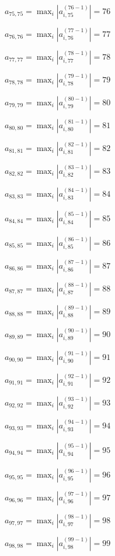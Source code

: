 \documentclass[a4paper,12pt]{article}
\begin{document}
$a _{ 75, 75 } =  \max _i |a _{ i, 75 } ^{ (76 - 1) } | = 76$

$a _{ 76, 76 } =  \max _i |a _{ i, 76 } ^{ (77 - 1) } | = 77$

$a _{ 77, 77 } =  \max _i |a _{ i, 77 } ^{ (78 - 1) } | = 78$

$a _{ 78, 78 } =  \max _i |a _{ i, 78 } ^{ (79 - 1) } | = 79$

$a _{ 79, 79 } =  \max _i |a _{ i, 79 } ^{ (80 - 1) } | = 80$

$a _{ 80, 80 } =  \max _i |a _{ i, 80 } ^{ (81 - 1) } | = 81$

$a _{ 81, 81 } =  \max _i |a _{ i, 81 } ^{ (82 - 1) } | = 82$

$a _{ 82, 82 } =  \max _i |a _{ i, 82 } ^{ (83 - 1) } | = 83$

$a _{ 83, 83 } =  \max _i |a _{ i, 83 } ^{ (84 - 1) } | = 84$

$a _{ 84, 84 } =  \max _i |a _{ i, 84 } ^{ (85 - 1) } | = 85$

$a _{ 85, 85 } =  \max _i |a _{ i, 85 } ^{ (86 - 1) } | = 86$

$a _{ 86, 86 } =  \max _i |a _{ i, 86 } ^{ (87 - 1) } | = 87$

$a _{ 87, 87 } =  \max _i |a _{ i, 87 } ^{ (88 - 1) } | = 88$

$a _{ 88, 88 } =  \max _i |a _{ i, 88 } ^{ (89 - 1) } | = 89$

$a _{ 89, 89 } =  \max _i |a _{ i, 89 } ^{ (90 - 1) } | = 90$

$a _{ 90, 90 } =  \max _i |a _{ i, 90 } ^{ (91 - 1) } | = 91$

$a _{ 91, 91 } =  \max _i |a _{ i, 91 } ^{ (92 - 1) } | = 92$

$a _{ 92, 92 } =  \max _i |a _{ i, 92 } ^{ (93 - 1) } | = 93$

$a _{ 93, 93 } =  \max _i |a _{ i, 93 } ^{ (94 - 1) } | = 94$

$a _{ 94, 94 } =  \max _i |a _{ i, 94 } ^{ (95 - 1) } | = 95$

$a _{ 95, 95 } =  \max _i |a _{ i, 95 } ^{ (96 - 1) } | = 96$

$a _{ 96, 96 } =  \max _i |a _{ i, 96 } ^{ (97 - 1) } | = 97$

$a _{ 97, 97 } =  \max _i |a _{ i, 97 } ^{ (98 - 1) } | = 98$

$a _{ 98, 98 } =  \max _i |a _{ i, 98 } ^{ (99 - 1) } | = 99$
\end{document}
